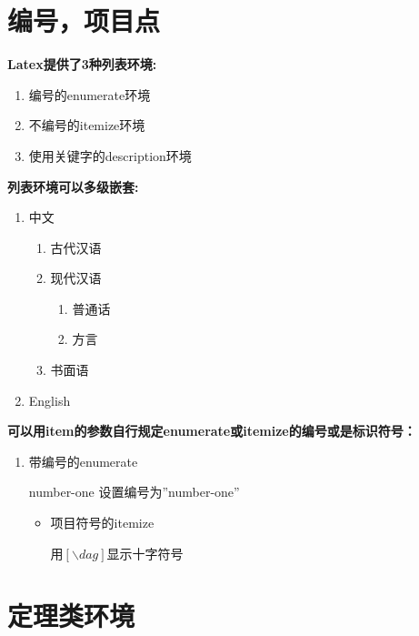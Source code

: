 \documentclass[UTF8]{ctexbook}
\begin{document}
\section{编号，项目点}
\textbf{Latex提供了3种列表环境:}
\begin{enumerate}
  \centering
  \item 编号的enumerate环境
  \item 不编号的itemize环境
  \item 使用关键字的description环境
\end{enumerate}
\textbf{列表环境可以多级嵌套:}
\begin{enumerate}
  \item 中文
  \begin{enumerate}
    \item 古代汉语
    \item 现代汉语
    \begin{enumerate}
      \item 普通话
      \item 方言
    \end{enumerate}
    \item 书面语
  \end{enumerate}
  \item English
\end{enumerate}
\textbf{可以用item的参数自行规定enumerate或itemize的编号或是标识符号：}
\begin{enumerate}
  \centering
  \item 带编号的enumerate
  \item[number-one]设置编号为”number-one”
  \begin{itemize}
    \centering
    \item 项目符号的itemize
    \item[\dag] 用$[\backslash dag]$显示十字符号
  \end{itemize}
\end{enumerate}

\section{定理类环境}
\end{document}

